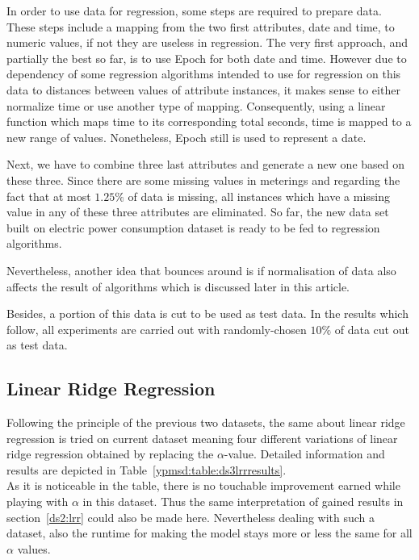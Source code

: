 In order to use data for regression, some steps are required to prepare data. These
steps include a mapping from the two first attributes, date and time, to numeric
values, if not they are useless in regression. The very first approach, and partially
the best so far, is to use Epoch\cite{ritchie1971unix} for both date and time.
However due to dependency of some regression algorithms intended to use for
regression on this data to distances between values of attribute instances, it
makes sense to either normalize time or use another type of mapping.
Consequently, using a linear function which maps time to its corresponding total
seconds, time is mapped to a new range of values. Nonetheless, Epoch still is
used to represent a date.\par
Next, we have to combine three last attributes and generate a new one based on
these three. Since there are some missing values in meterings and regarding the
fact that at most $1.25\%$ of data is missing, all instances which have a missing
value in any of these three attributes are eliminated. So far, the new data set
built on electric power consumption dataset is ready to be fed to regression
algorithms. \par
Nevertheless, another idea that bounces around is if normalisation of
data also affects the result of algorithms which is discussed later in this
article.\par
Besides, a portion of this data is cut to be used as test data. In the results
which follow, all experiments are carried out with randomly-chosen $10\%$ of data
cut out as test data.

\subsection{Linear Ridge Regression}

Following the principle of the previous two datasets, the same about linear ridge
regression is tried on current dataset meaning four different variations of
linear ridge regression obtained by replacing  the $\alpha$-value. Detailed
information and results are depicted in Table~\ref{ypmsd:table:ds3lrrresults}.
\\
As it is noticeable in the table, there is no touchable improvement earned while
playing with $\alpha$ in this dataset. Thus the same interpretation of gained
results in section~\ref{ds2:lrr} could also be made here. Nevertheless dealing
with such a dataset, also the runtime for making the model stays more or less the same for all
$\alpha$ values.



